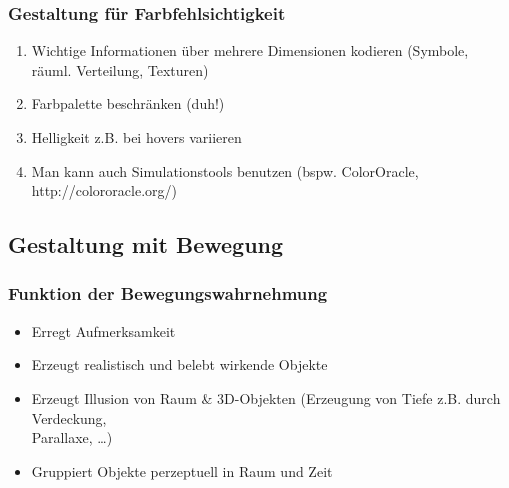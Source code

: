		\subsubsection{Gestaltung für Farbfehlsichtigkeit}
			\begin{enumerate}
				\item Wichtige Informationen über mehrere Dimensionen kodieren (Symbole, räuml. Verteilung, Texturen)
				
				\item Farbpalette beschränken (duh!)
				
				\item Helligkeit z.B. bei hovers variieren
				
				\item Man kann auch Simulationstools benutzen (bspw. ColorOracle, http://colororacle.org/) \biglb
			\end{enumerate}
		
	
	\subsection{Gestaltung mit Bewegung}
		\subsubsection{Funktion der Bewegungswahrnehmung}
			\begin{itemize}
				\item Erregt Aufmerksamkeit
				\item Erzeugt realistisch und belebt wirkende Objekte
				\item Erzeugt Illusion von Raum \& 3D-Objekten (Erzeugung von Tiefe z.B. durch Verdeckung,\\ Parallaxe, \ldots)
				\item Gruppiert Objekte perzeptuell in Raum und Zeit
			\end{itemize}
			
			
			
			
			
			
			
			
			
			
			
			
			
			
			
	
	
	
	
	
	
	